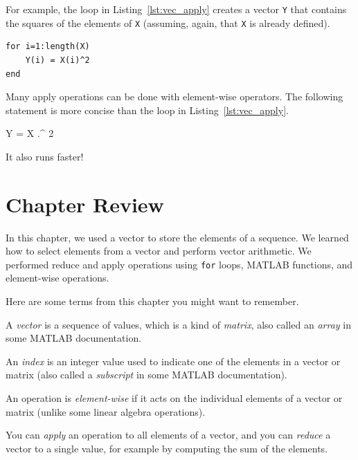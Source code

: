 
For example, the loop in Listing~\ref{lst:vec_apply} creates a vector \lstinline{Y} that
contains the squares of the elements of \lstinline{X} (assuming, again, that \lstinline{X} is already defined).

\begin{lstlisting}[caption={Making a new vector Y by squaring the elements in X}, label={lst:vec_apply}]
for i=1:length(X)
    Y(i) = X(i)^2
end
\end{lstlisting}

Many apply operations can be done with element-wise operators.
The following statement is more concise than the loop in
Listing~\ref{lst:vec_apply}.

\begin{code}
Y = X .^ 2
\end{code}

It also runs faster!


\section{Chapter Review}

In this chapter, we used a vector to store the elements of a sequence.  We learned how to select elements from a vector and perform vector arithmetic.  We performed reduce and apply operations using \lstinline{for} loops, MATLAB functions, and element-wise operations.

Here are some terms from this chapter you might want to remember.


A \emph{vector} is a sequence of values, which is a kind of \emph{matrix}, also called an \emph{array} in some MATLAB documentation.

An \emph{index} is an integer value used to indicate one of the elements
in a vector or matrix (also called a \emph{subscript} in some MATLAB documentation).

An operation is \emph{element-wise} if it acts on the individual elements of a vector or matrix (unlike some linear algebra operations).

You can \emph{apply} an operation to all elements of a vector, and you can \mbox{\emph{reduce}} a vector to a single value, for example by computing the sum of the elements.

